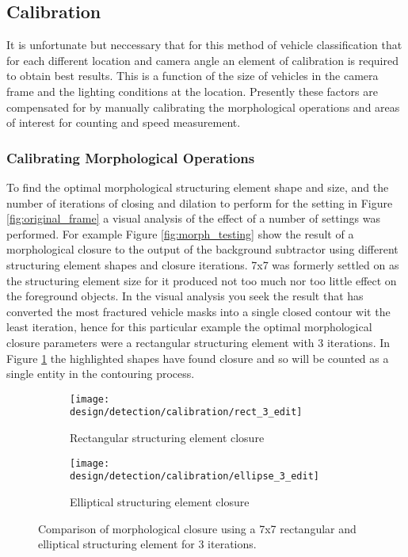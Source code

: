 \subsection{Calibration}

It is unfortunate but neccessary that for this method of vehicle classification that for each different location and camera angle an element of calibration is required to obtain best results. This is a function of the size of vehicles in the camera frame and the lighting conditions at the location. Presently these factors are compensated for by manually calibrating the morphological operations and areas of interest for counting and speed measurement. 

\subsubsection{Calibrating Morphological Operations}

To find the optimal morphological structuring element shape and size, and the number of iterations of closing and dilation to perform for the setting in Figure \ref{fig:original_frame} a visual analysis of the effect of a number of settings was performed. For example Figure \ref{fig:morph_testing} show the result of a morphological closure to the output of the background subtractor using different structuring element shapes and closure iterations. 7x7 was formerly settled on as the structuring element size for it produced not too much nor too little effect on the foreground objects. In the visual analysis you seek the result that has converted the most fractured vehicle masks into a single closed contour wit the least iteration, hence for this particular example the optimal morphological closure parameters were a rectangular structuring element with 3 iterations. In Figure \ref{fig:compare_closure} the highlighted shapes have found closure and so will be counted as a single entity in the contouring process.


\begin{figure}[htbp]
    \centering
    \begin{subfigure}[b]{0.42\textwidth}
        \texttt{[image: design/detection/calibration/rect\_3\_edit]}
        \captionsetup{format = hang}
        \caption{Rectangular structuring element closure}
    \end{subfigure}
    \begin{subfigure}[b]{0.42\textwidth}
        \texttt{[image: design/detection/calibration/ellipse\_3\_edit]}
        \captionsetup{format = hang}
        \caption{Elliptical structuring element closure}
    \end{subfigure}
    \captionsetup{format = hang}
    \caption{Comparison of morphological closure using a 7x7 rectangular and elliptical structuring element for 3 iterations.}
    \label{fig:compare_closure}
\end{figure}


